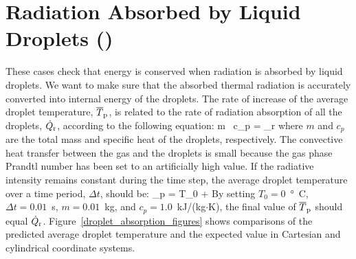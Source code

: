 \documentclass[11pt]{book}
\begin{document}
\section{Radiation Absorbed by Liquid Droplets (\texorpdfstring{}{droplet\_absorption}) }
\label{droplet_absorption}
\label{droplet_absorption_cart}
\label{droplet_absorption_cyl}

These cases check that energy is conserved when radiation is absorbed by liquid droplets. We want to make sure that the absorbed thermal radiation is accurately converted into internal energy of the droplets. The rate of increase of the average droplet temperature, $\overline{T}_{\rm p}$, is related to the rate of radiation absorption of all the droplets, $\dot{Q}_{\rm r}$, according to the following equation:
\be
m \, c_p  = _{\rm r}
\ee
where $m$ and $c_p$ are the total mass and specific heat of the droplets, respectively. The convective heat transfer between the gas and the droplets is small because the gas phase Prandtl number has been set to an artificially high value. If the radiative intensity remains constant during the time step, the average droplet temperature over a time period, $\Delta t$, should be:
\be
{}_{\rm p} = T_0 + 
\ee
By setting $T_0=0$~\si{\degree C}, $\Delta t =0.01$~s, $m =0.01$~kg, and $c_p =1.0$~kJ/(kg$\cdot$K), the final value of $\overline{T}_{\rm p}$ should equal $\dot{Q}_{\rm r}$. Figure~\ref{droplet_absorption_figures} shows comparisons of the predicted average droplet temperature and the expected value in Cartesian and cylindrical coordinate systems.
\end{document}

